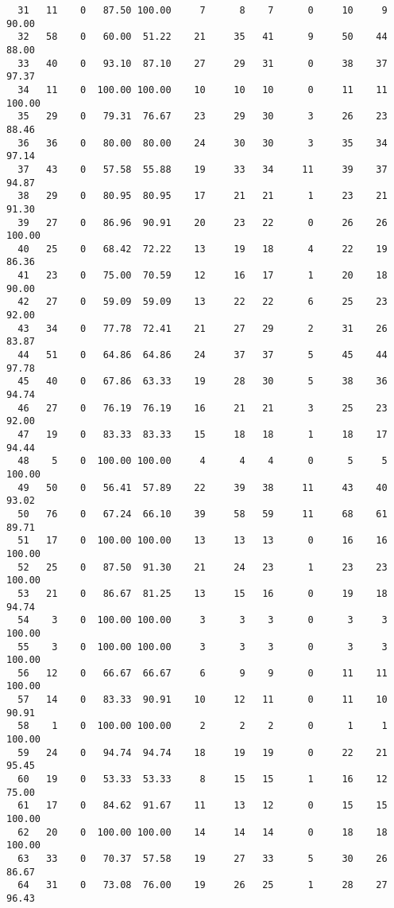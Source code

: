 \begin{verbatim}
  31   11    0   87.50 100.00     7      8    7      0     10     9    90.00
  32   58    0   60.00  51.22    21     35   41      9     50    44    88.00
  33   40    0   93.10  87.10    27     29   31      0     38    37    97.37
  34   11    0  100.00 100.00    10     10   10      0     11    11   100.00
  35   29    0   79.31  76.67    23     29   30      3     26    23    88.46
  36   36    0   80.00  80.00    24     30   30      3     35    34    97.14
  37   43    0   57.58  55.88    19     33   34     11     39    37    94.87
  38   29    0   80.95  80.95    17     21   21      1     23    21    91.30
  39   27    0   86.96  90.91    20     23   22      0     26    26   100.00
  40   25    0   68.42  72.22    13     19   18      4     22    19    86.36
  41   23    0   75.00  70.59    12     16   17      1     20    18    90.00
  42   27    0   59.09  59.09    13     22   22      6     25    23    92.00
  43   34    0   77.78  72.41    21     27   29      2     31    26    83.87
  44   51    0   64.86  64.86    24     37   37      5     45    44    97.78
  45   40    0   67.86  63.33    19     28   30      5     38    36    94.74
  46   27    0   76.19  76.19    16     21   21      3     25    23    92.00
  47   19    0   83.33  83.33    15     18   18      1     18    17    94.44
  48    5    0  100.00 100.00     4      4    4      0      5     5   100.00
  49   50    0   56.41  57.89    22     39   38     11     43    40    93.02
  50   76    0   67.24  66.10    39     58   59     11     68    61    89.71
  51   17    0  100.00 100.00    13     13   13      0     16    16   100.00
  52   25    0   87.50  91.30    21     24   23      1     23    23   100.00
  53   21    0   86.67  81.25    13     15   16      0     19    18    94.74
  54    3    0  100.00 100.00     3      3    3      0      3     3   100.00
  55    3    0  100.00 100.00     3      3    3      0      3     3   100.00
  56   12    0   66.67  66.67     6      9    9      0     11    11   100.00
  57   14    0   83.33  90.91    10     12   11      0     11    10    90.91
  58    1    0  100.00 100.00     2      2    2      0      1     1   100.00
  59   24    0   94.74  94.74    18     19   19      0     22    21    95.45
  60   19    0   53.33  53.33     8     15   15      1     16    12    75.00
  61   17    0   84.62  91.67    11     13   12      0     15    15   100.00
  62   20    0  100.00 100.00    14     14   14      0     18    18   100.00
  63   33    0   70.37  57.58    19     27   33      5     30    26    86.67
  64   31    0   73.08  76.00    19     26   25      1     28    27    96.43

\end{verbatim}
